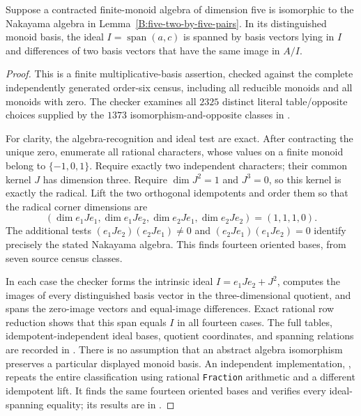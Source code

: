 \begin{lemma}
\label{B:five-Nakayama-common-annihilator}
Suppose a contracted finite-monoid algebra of dimension five
is isomorphic to the Nakayama algebra in
Lemma~\ref{B:five-two-by-five-pairs}.  In its distinguished
monoid basis, the ideal $I=\operatorname{span}(a,c)$ is spanned
by basis vectors lying in $I$ and differences of two basis
vectors that have the same image in $A/I$.
\end{lemma}
\begin{proof}
This is a finite multiplicative-basis assertion, checked against
the complete independently generated order-six census, including
all reducible monoids and all monoids with zero.
The checker  examines
all $2325$ distinct literal table/opposite choices supplied by
the $1373$ isomorphism-and-opposite classes in
.

For clarity, the algebra-recognition and ideal test are exact.
After contracting the unique zero, enumerate all rational
characters, whose values on a finite monoid belong to
$\{-1,0,1\}$.  Require exactly two independent characters;
their common kernel $J$ has dimension three.  Require
$\dim J^2=1$ and $J^3=0$, so this kernel is exactly the
radical.  Lift the two orthogonal idempotents and order them
so that the radical corner dimensions are
\[
 (\dim e_1Je_1,\dim e_1Je_2,
   \dim e_2Je_1,\dim e_2Je_2)=(1,1,1,0).
\]
The additional tests
$(e_1Je_2)(e_2Je_1)\ne0$ and
$(e_2Je_1)(e_1Je_2)=0$ identify precisely the stated
Nakayama algebra.  This finds fourteen oriented bases, from
seven source census classes.

In each case the checker forms the intrinsic ideal
$I=e_1Je_2+J^2$, computes the images of every distinguished
basis vector in the three-dimensional quotient, and spans
the zero-image vectors and equal-image differences.  Exact
rational row reduction shows that this span equals $I$
in all fourteen cases.  The full tables, idempotent-independent
ideal bases, quotient coordinates, and spanning relations are
recorded in
.
There is no assumption that an abstract algebra isomorphism
preserves a particular displayed monoid basis.
An independent implementation,
, repeats the entire
classification using rational \texttt{Fraction} arithmetic and a
different idempotent lift.  It finds the same fourteen oriented
bases and verifies every ideal-spanning equality; its results are
in .
\end{proof}

